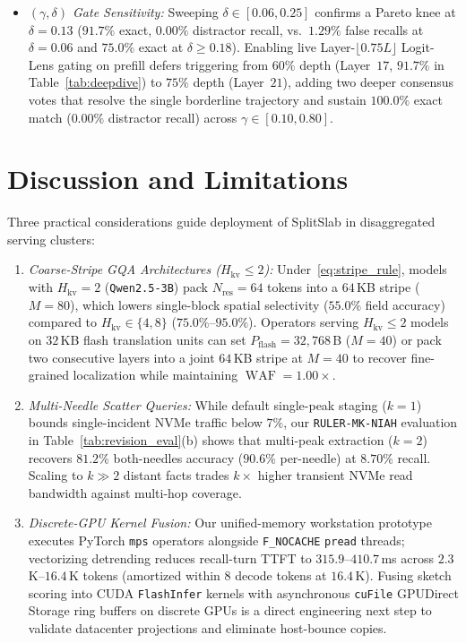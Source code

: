 \documentclass[final,5p,times,twocolumn]{elsarticle}
\theoremstyle{definition}
\theoremstyle{remark}
\newcommand{\SplitSlab}{\textup{\textsc{SplitSlab}}}
\newcommand{\WAF}{\operatorname{WAF}}
\def\SplitSlab{SplitSlab}%
\begin{document}
\begin{itemize}
  \item \emph{$(\gamma, \delta)$ Gate Sensitivity:} Sweeping $\delta \in [0.06, 0.25]$ confirms a Pareto knee at $\delta = 0.13$ ($91.7\%$ exact, $0.00\%$ distractor recall, vs.\ $1.29\%$ false recalls at $\delta = 0.06$ and $75.0\%$ exact at $\delta \ge 0.18$). Enabling live Layer-$\lfloor 0.75L\rfloor$ Logit-Lens gating on prefill defers triggering from $60\%$ depth (Layer~$17$, $91.7\%$ in Table~\ref{tab:deepdive}) to $75\%$ depth (Layer~$21$), adding two deeper consensus votes that resolve the single borderline trajectory and sustain $100.0\%$ exact match ($0.00\%$ distractor recall) across $\gamma \in [0.10, 0.80]$.
\end{itemize}

\section{Discussion and Limitations}\label{sec:discussion}

Three practical considerations guide deployment of \SplitSlab{} in disaggregated serving clusters:
\begin{enumerate}
  \item \emph{Coarse-Stripe GQA Architectures ($H_{\mathrm{kv}} \le 2$):} Under~\eqref{eq:stripe_rule}, models with $H_{\mathrm{kv}} = 2$ (\texttt{Qwen2.5-3B}) pack $N_{\mathrm{res}} = 64$ tokens into a $64$\,KB stripe ($M = 80$), which lowers single-block spatial selectivity ($55.0\%$ field accuracy) compared to $H_{\mathrm{kv}} \in \{4,8\}$ ($75.0\%$--$95.0\%$). Operators serving $H_{\mathrm{kv}} \le 2$ models on $32$\,KB flash translation units can set $P_{\mathrm{flash}} = 32{,}768$\,B ($M = 40$) or pack two consecutive layers into a joint $64$\,KB stripe at $M = 40$ to recover fine-grained localization while maintaining $\WAF = 1.00\times$.
  \item \emph{Multi-Needle Scatter Queries:} While default single-peak staging ($k{=}1$) bounds single-incident NVMe traffic below $7\%$, our \texttt{RULER-MK-NIAH} evaluation in Table~\ref{tab:revision_eval}(b) shows that multi-peak extraction ($k{=}2$) recovers $81.2\%$ both-needles accuracy ($90.6\%$ per-needle) at $8.70\%$ recall. Scaling to $k \gg 2$ distant facts trades $k\times$ higher transient NVMe read bandwidth against multi-hop coverage.
  \item \emph{Discrete-GPU Kernel Fusion:} Our unified-memory workstation prototype executes PyTorch \texttt{mps} operators alongside \texttt{F\_NOCACHE} \texttt{pread} threads; vectorizing detrending reduces recall-turn TTFT to $315.9$--$410.7$\,ms across $2.3$\,K--$16.4$\,K tokens (amortized within $8$ decode tokens at $16.4$\,K). Fusing sketch scoring into CUDA \texttt{FlashInfer} kernels with asynchronous \texttt{cuFile} GPUDirect Storage ring buffers on discrete GPUs is a direct engineering next step to validate datacenter projections and eliminate host-bounce copies.
\end{enumerate}
\end{document}
